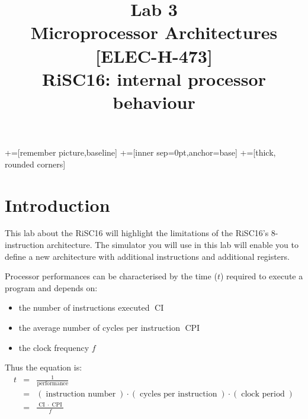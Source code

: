 \documentclass[10pt,a4paper]{article}
\date{\vspace{-1cm}\version}
\title{\vspace{-2cm} Lab 3\\ Microprocessor Architectures [ELEC-H-473]\\ RiSC16: internal processor behaviour  \ifthenelse{\boolean{corrige}}{~\\Corrigé}{}}
\theoremstyle{definition}%
\newcommand{\on}[1]{\operatorname{#1}}
\begin{document}
\newcommand\tabnode[1]{\addtocounter{nodecount}{1} \tikz \node (\arabic{nodecount}) {#1};}

+=[remember picture,baseline]
+=[inner sep=0pt,anchor=base]
+=[thick, rounded corners]



\maketitle
\section*{Introduction}

This lab about the RiSC16 will highlight the limitations of the RiSC16's 8-instruction architecture. The simulator you will use in this lab will enable you to define a new architecture with additional instructions and additional registers.


Processor performances can be characterised by the time ($t$) required to execute a program and depends on:
\begin{itemize}
\item the number of instructions executed $\on{CI}$
\item the average number of cycles per instruction $\on{CPI}$
\item the clock frequency $f$
\end{itemize}

Thus the equation is:
%
\begin{eqnarray*}
t & = & \frac{1}{\on{performance}}\\
& = & (\on{instruction~ number})\cdot(\on{cycles~ per~ instruction})\cdot(\on{clock~ period})\\
& = & \frac{\on{CI}\cdot \on{CPI}}{f} \\
\end{eqnarray*}
\end{document}
